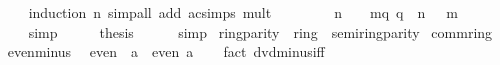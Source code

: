 \begin{isabellebody}
\ \ \ \ \isamarkupfalse%
\ {\isacharparenleft}{\kern0pt}induction\ n{\isacharparenright}{\kern0pt}\ {\isacharparenleft}{\kern0pt}simp{\isacharunderscore}{\kern0pt}all\ add{\isacharcolon}{\kern0pt}\ ac{\isacharunderscore}{\kern0pt}simps\ mult{\isacharunderscore}{\kern0pt}{}\ {\isacharasterisk}{\kern0pt}{\isacharparenright}{\kern0pt}\isanewline
\ \ \isamarkupfalse%
\ \isamarkupfalse%
\ {\isacartoucheopen}{}\ {\isacharcircum}{\kern0pt}\ n\ {\isacharminus}{\kern0pt}\ {}\ {\isacharequal}{\kern0pt}\ {\isacharparenleft}{\kern0pt}{\isasymSum}m{\isasymin}{\isacharbraceleft}{\kern0pt}q{\isachardot}{\kern0pt}\ q\ {\isacharless}{\kern0pt}\ n{\isacharbraceright}{\kern0pt}{\isachardot}{\kern0pt}\ {}\ {\isacharcircum}{\kern0pt}\ m{\isacharparenright}{\kern0pt}\ {\isacharplus}{\kern0pt}\ {}\ {\isacharminus}{\kern0pt}\ {}{\isacartoucheclose}\isanewline
\ \ \ \ \isamarkupfalse%
\ simp\isanewline
\ \ \isamarkupfalse%
\ \isamarkupfalse%
\ {\isacharquery}{\kern0pt}thesis\isanewline
\ \ \ \ \isamarkupfalse%
\ simp\isanewline
{}\isamarkupfalse%
%
\endisatagproof
{\isafoldproof}%
%
\isadelimproof
\isanewline
%
\endisadelimproof
\isanewline
{}\isamarkupfalse%
\isanewline
\isanewline
{}\isamarkupfalse%
\ ring{\isacharunderscore}{\kern0pt}parity\ {\isacharequal}{\kern0pt}\ ring\ {\isacharplus}{\kern0pt}\ semiring{\isacharunderscore}{\kern0pt}parity\isanewline
{}\isanewline
\isanewline
{}\isamarkupfalse%
\ comm{\isacharunderscore}{\kern0pt}ring{\isacharunderscore}{\kern0pt}{}%
\isadelimproof
\ %
\endisadelimproof
%
\isatagproof
\isacommand{{\isachardot}{\kern0pt}{\isachardot}{\kern0pt}}\isamarkupfalse%
%
\endisatagproof
{\isafoldproof}%
%
\isadelimproof
%
\endisadelimproof
\isanewline
\isanewline
{}\isamarkupfalse%
\ even{\isacharunderscore}{\kern0pt}minus{\isacharcolon}{\kern0pt}\isanewline
\ \ {\isachardoublequoteopen}even\ {\isacharparenleft}{\kern0pt}{\isacharminus}{\kern0pt}\ a{\isacharparenright}{\kern0pt}\ {\isasymlongleftrightarrow}\ even\ a{\isachardoublequoteclose}\isanewline
%
\isadelimproof
\ \ %
\endisadelimproof
%
\isatagproof
{}\isamarkupfalse%
\ {\isacharparenleft}{\kern0pt}fact\ dvd{\isacharunderscore}{\kern0pt}minus{\isacharunderscore}{\kern0pt}iff{\isacharparenright}{\kern0pt}%
\endisatagproof
{\isafoldproof}%
%
\isadelimproof
\isanewline
%
\endisadelimproof
\isanewline

\end{isabellebody}
